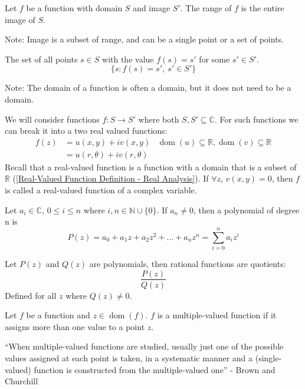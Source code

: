 \documentclass[12pt, english]{book}
\begin{document}
	\begin{definition}[Range]
		Let $f$ be a function with domain $S$ and image $S'$. The range of $f$ is the entire image of $S$.
	\end{definition}

	Note: Image is a subset of range, and can be a single point or a set of points.

	\begin{definition}
		The set of all points $s \in S$ with the value $f(s) = s'$ for some $s' \in S'$.
		$$\{s : f(s) = s', \ s' \in S'\}$$
	\end{definition}
	
	Note: The domain of a function is often a domain, but it does not need to be a domain. 
	
	We will consider functions $f: S \rightarrow S'$ where both $S, S' \subseteq \mathbb{C}$. For such functions we can break it into a two real valued functions: 
	\begin{align*}
		f(z) &= u(x, y) + i v(x, y)
			& \operatorname{dom}(u) \subseteq \mathbb{R}, \operatorname{dom}(v) \subseteq \mathbb{R} \\
			&= u(r, \theta) + i v(r, \theta)
	\end{align*}
	Recall that a real-valued function is a function with a domain that is a subset of $\mathbb{R}$ (\cref{Real-Valued Function Definition - Real Analysis}).
	If $\forall z$, $v(x, y) = 0$, then $f$ is called a real-valued function of a complex variable. 
	
	\begin{definition}[Polynomial]
		\label{Polynomial Definition - Complex}
		Let $a_i \in \mathbb{C}$, $0 \leq i \leq n$ where $i, n \in \mathbb{N}\cup\{0\}$. If $a_n \neq 0$, then a polynomial of degree n is
		$$P(z) = a_0 + a_1 z + a_2 z^2 + \ldots + a_n z^n = \sum_{i=0}^n a_i z^i$$
	\end{definition}

	\begin{definition}
		\label{Rational Functions Definition - Complex}
		Let $P(z)$ and $Q(z)$ are polynomials, then rational functions are quotients:
		$$\frac{P(z)}{Q(z)}$$
		Defined for all $z$ where $Q(z) \neq 0$.
	\end{definition}
	
	\begin{definition}
		\label{Multiple-Valued Function Definition - Complex}
		Let $f$ be a function and $z \in \operatorname{dom}(f)$. $f$ is a multiple-valued function if it assigns more than one value to a point $z$.
	\end{definition}
	``When multiple-valued functions are studied, usually just one of the possible values assigned at each point is taken, in a systematic manner and a (single-valued) function is constructed from the multiple-valued one'' - Brown and Churchill \cite{Brown.J;Churchill.R-Complex-Variables-2014}
	
\end{document}
